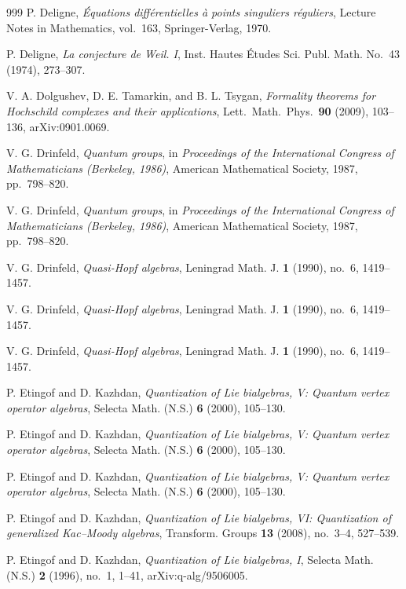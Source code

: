 \begin{thebibliography}{999}
P. Deligne, \emph{\'Equations diff\'erentielles \`a points singuliers r\'eguliers}, Lecture Notes in Mathematics, vol.~163, Springer-Verlag, 1970.

P. Deligne, \emph{La conjecture de Weil. I}, Inst. Hautes \'Etudes Sci. Publ. Math. No.~43 (1974), 273--307.

V. A. Dolgushev, D. E. Tamarkin, and B. L. Tsygan, \emph{Formality theorems for Hochschild complexes and their applications}, Lett.\ Math.\ Phys.\ \textbf{90} (2009), 103--136, arXiv:0901.0069.

V. G. Drinfeld, \emph{Quantum groups}, in \emph{Proceedings of the International Congress of Mathematicians (Berkeley, 1986)}, American Mathematical Society, 1987, pp.~798--820.

V. G. Drinfeld, \emph{Quantum groups}, in \emph{Proceedings of the International Congress of Mathematicians (Berkeley, 1986)}, American Mathematical Society, 1987, pp.~798--820.

V. G. Drinfeld, \emph{Quasi-Hopf algebras}, Leningrad Math. J. \textbf{1} (1990), no.~6, 1419--1457.

V. G. Drinfeld, \emph{Quasi-Hopf algebras}, Leningrad Math. J. \textbf{1} (1990), no.~6, 1419--1457.

V. G. Drinfeld, \emph{Quasi-Hopf algebras}, Leningrad Math. J. \textbf{1} (1990), no.~6, 1419--1457.

P. Etingof and D. Kazhdan, \emph{Quantization of Lie bialgebras, V: Quantum vertex operator algebras}, Selecta Math. (N.S.) \textbf{6} (2000), 105--130.

P. Etingof and D. Kazhdan, \emph{Quantization of Lie bialgebras, V: Quantum vertex operator algebras}, Selecta Math. (N.S.) \textbf{6} (2000), 105--130.

P. Etingof and D. Kazhdan, \emph{Quantization of Lie bialgebras, V: Quantum vertex operator algebras}, Selecta Math. (N.S.) \textbf{6} (2000), 105--130.

P. Etingof and D. Kazhdan, \emph{Quantization of Lie bialgebras, VI: Quantization of generalized Kac--Moody algebras}, Transform. Groups \textbf{13} (2008), no.~3--4, 527--539.

P. Etingof and D. Kazhdan, \emph{Quantization of Lie bialgebras, I}, Selecta Math. (N.S.) \textbf{2} (1996), no.~1, 1--41, arXiv:q-alg/9506005.


\end{thebibliography}
